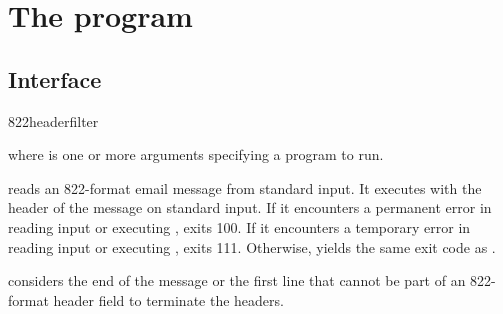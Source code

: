 
\chapter{The  program}

\section{Interface}
\begin{code}
  822headerfilter 
\end{code}
where  is one or more arguments specifying a program to
run.

 reads an 822-format email message from standard
input.  It executes  with the header of the message on
standard input.  If it encounters a permanent error in reading input
or executing ,  exits 100.  If it
encounters a temporary error in reading input or executing
,  exits 111.  Otherwise,
 yields the same exit code as .

 considers the end of the message or the first
line that cannot be part of an 822-format header field to terminate
the headers.

